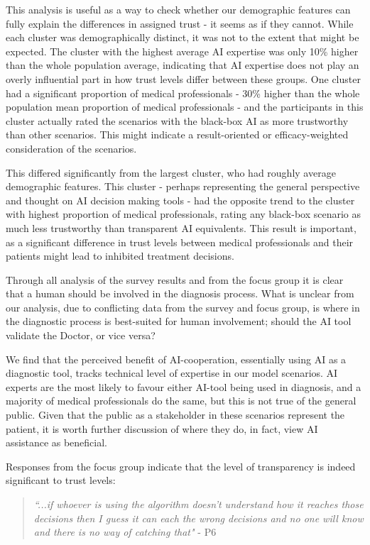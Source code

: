 \documentclass[manuscript,screen,review]{acmart}
\begin{document}
This analysis is useful as a way to check whether our demographic features can fully explain the differences in assigned trust - it seems as if they cannot. While each cluster was demographically distinct, it was not to the extent that might be expected. The cluster with the highest average AI expertise was only 10\% higher than the whole population average, indicating that AI expertise does not play an overly influential part in how trust levels differ between these groups. One cluster had a significant proportion of medical professionals - 30\% higher than the whole population mean proportion of medical professionals - and the participants in this cluster actually rated the scenarios with the black-box AI as more trustworthy than other scenarios. This might indicate a result-oriented or efficacy-weighted consideration of the scenarios.

This differed significantly from the largest cluster, who had roughly average demographic features. This cluster - perhaps representing the general perspective and thought on AI decision making tools - had the opposite trend to the cluster with highest proportion of medical professionals, rating any black-box scenario as much less trustworthy than transparent AI equivalents. This result is important, as a significant difference in trust levels between medical professionals and their patients might lead to inhibited treatment decisions.

Through all analysis of the survey results and from the focus group it is clear that a human should be involved in the diagnosis process. What is unclear from our analysis, due to conflicting data from the survey and focus group, is where in the diagnostic process is best-suited for human involvement; should the AI tool validate the Doctor, or vice versa?

We find that the perceived benefit of AI-cooperation, essentially using AI as a diagnostic tool, tracks technical level of expertise in our model scenarios. AI experts are the most likely to favour either AI-tool being used in diagnosis, and a majority of medical professionals do the same, but this is not true of the general public. Given that the public as a stakeholder in these scenarios represent the patient, it is worth further discussion of where they do, in fact, view AI assistance as beneficial.

Responses from the focus group indicate that the level of transparency is indeed significant to trust levels:

\begin{quote}
    \textit{``...if whoever is using the algorithm doesn't understand how it reaches those decisions then I guess it can each the wrong decisions and no one will know and there is no way of catching that"} - P6
\end{quote}
\end{document}
